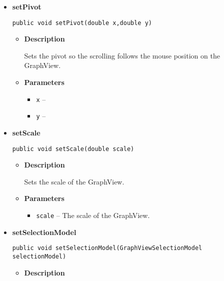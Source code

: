 {{{{{{{\begin{itemize}
{\begin{itemize}
{Sets a graph. Every element in the graph will be generated and then shown.
}
\item{
{\bf  Parameters}
  \begin{itemize}
   \item{
\texttt{graph} -- The graph to be visualized in the view.}
  \end{itemize}
}%
\end{itemize}
}%
\item{ 
{\bf  setPivot}\\
\begin{lstlisting}[frame=none]
public void setPivot(double x,double y)\end{lstlisting} %
\begin{itemize}
\item{
{\bf  Description}

Sets the pivot so the scrolling follows the mouse position on the GraphView.
}
\item{
{\bf  Parameters}
  \begin{itemize}
   \item{
\texttt{x} -- }
   \item{
\texttt{y} -- }
  \end{itemize}
}%
\end{itemize}
}%
\item{ 
{\bf  setScale}\\
\begin{lstlisting}[frame=none]
public void setScale(double scale)\end{lstlisting} %
\begin{itemize}
\item{
{\bf  Description}

Sets the scale of the GraphView.
}
\item{
{\bf  Parameters}
  \begin{itemize}
   \item{
\texttt{scale} -- The scale of the GraphView.}
  \end{itemize}
}%
\end{itemize}
}%
\item{ 
{\bf  setSelectionModel}\\
\begin{lstlisting}[frame=none]
public void setSelectionModel(GraphViewSelectionModel selectionModel)\end{lstlisting} %
\begin{itemize}
\item{
{\bf  Description}

}
\end{itemize}}
\end{itemize}}}}}}}}
